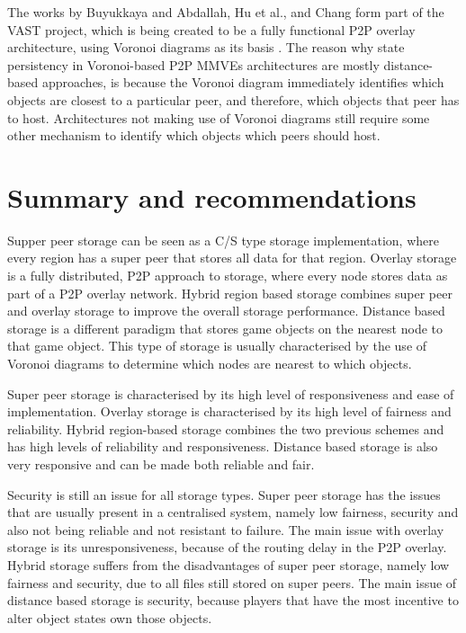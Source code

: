 The works by Buyukkaya and Abdallah, Hu et al., and Chang form part of the VAST project, which is being created to be a fully functional P2P overlay
architecture, using Voronoi diagrams as its basis \cite{VAST}. The reason why state persistency in Voronoi-based P2P MMVEs architectures are mostly
distance-based approaches, is because the Voronoi diagram immediately identifies which objects are closest to a particular peer, and therefore, which
objects that peer has to host. Architectures not making use of Voronoi diagrams still require some other mechanism to identify which objects which
peers should host.

\section{Summary and recommendations}
\label{recommendations}

Supper peer storage can be seen as a C/S type storage implementation, where every region has a super peer that stores all data for that region.
Overlay storage is a fully distributed, P2P approach to storage, where every node stores data as part of a P2P overlay network. Hybrid region based
storage combines super peer and overlay storage to improve the overall storage performance. Distance based storage is a different paradigm that
stores game objects on the nearest node to that game object. This type of storage is usually characterised by the use of Voronoi diagrams to
determine which nodes are nearest to which objects.

Super peer storage is characterised by its high level of responsiveness and ease of implementation. Overlay storage is characterised by its high
level of fairness and reliability. Hybrid region-based storage combines the two previous schemes and has high levels of reliability and
responsiveness. Distance based storage is also very responsive and can be made both reliable and fair.

Security is still an issue for all storage types. Super peer storage has the issues that are usually present in a centralised system, namely low
fairness, security and also not being reliable and not resistant to failure. The main issue with overlay storage is its unresponsiveness, because of
the routing delay in the P2P overlay. Hybrid storage suffers from the disadvantages of super peer storage, namely low fairness and security, due to
all files still stored on super peers. The main issue of distance based storage is security, because players that have the most incentive to alter
object states own those objects.

